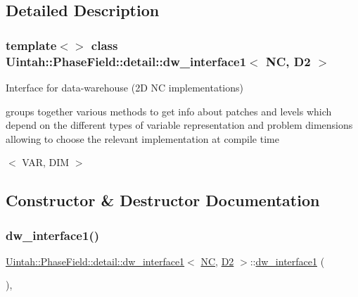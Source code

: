 \subsection{Detailed Description}
\subsubsection*{template$<$$>$\newline
class Uintah\+::\+Phase\+Field\+::detail\+::dw\+\_\+interface1$<$ N\+C, D2 $>$}

Interface for data-\/warehouse (2D NC implementations) 

groups together various methods to get info about patches and levels which depend on the different types of variable representation and problem dimensions allowing to choose the relevant implementation at compile time

$<$ V\+AR, D\+IM $>$ 

\subsection{Constructor \& Destructor Documentation}
\mbox{\label{classUintah_1_1PhaseField_1_1detail_1_1dw__interface1_3_01NC_00_01D2_01_4_ae2c45cfd0e5dca8e2158ebd86f498525}} 
\subsubsection{\texorpdfstring{dw\+\_\+interface1()}{dw\_interface1()}\hspace{0.1cm}{\footnotesize\ttfamily [1/2]}}
{\footnotesize\ttfamily \hyperlink{classUintah_1_1PhaseField_1_1detail_1_1dw__interface1}{Uintah\+::\+Phase\+Field\+::detail\+::dw\+\_\+interface1}$<$ \hyperlink{namespaceUintah_1_1PhaseField_a33d355affda78a83f45755ba8388cedda77924170fe82bfd58b74ca3e44139718}{NC}, \hyperlink{namespaceUintah_1_1PhaseField_a12bfc68444894dffdf0cb8d9cf0cc76aa1a451dae278b0103a94105c8776e9a67}{D2} $>$\+::\hyperlink{classUintah_1_1PhaseField_1_1detail_1_1dw__interface1}{dw\+\_\+interface1} (\begin{DoxyParamCaption}{ }\end{DoxyParamCaption})\hspace{0.3cm}{\ttfamily [protected]}, {\ttfamily [delete]}}



